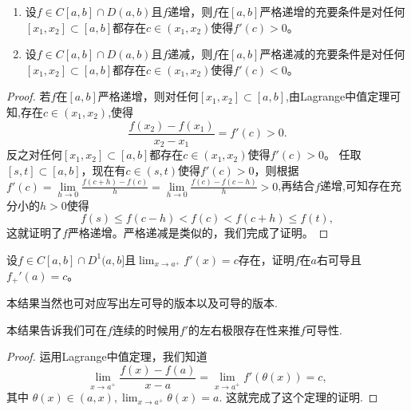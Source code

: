 \documentclass[lang=cn,newtx,10pt,scheme=chinese]{elegantbook}
\begin{document}
\begin{theorem}[严格单调和导数的关系]\label{theorem:严格单调和导数的关系}
\begin{enumerate}
\item 设\(f\in C[a,b]\cap D(a,b)\)且\(f\)递增，则\(f\)在\([a,b]\)严格递增的充要条件是对任何\([x_1,x_2]\subset [a,b]\)都存在\(c\in(x_1,x_2)\)使得\(f'(c)>0\)。

\item 设\(f\in C[a,b]\cap D(a,b)\)且\(f\)递减，则\(f\)在\([a,b]\)严格递减的充要条件是对任何\([x_1,x_2]\subset [a,b]\)都存在\(c\in(x_1,x_2)\)使得\(f'(c)<0\)。
\end{enumerate}
\end{theorem}
\begin{proof}
若\(f\)在\([a,b]\)严格递增，则对任何\([x_1,x_2]\subset [a,b]\),由Lagrange中值定理可知,存在\(c\in(x_1,x_2)\),使得
\[
\frac{f(x_2)-f(x_1)}{x_2 - x_1}=f'(c)>0.
\]
反之对任何\([x_1,x_2]\subset [a,b]\)都存在\(c\in(x_1,x_2)\)使得\(f'(c)>0\)。
任取\([s,t]\subset [a,b]\)，现在有\(c\in(s,t)\)使得\(f'(c)>0\)，则根据$f'\left( c \right) =\underset{h\rightarrow 0}{\lim}\frac{f\left( c+h \right) -f\left( c \right)}{h}=\underset{h\rightarrow 0}{\lim}\frac{f\left( c \right) -f\left( c-h \right)}{h}>0$,再结合$f$递增,可知存在充分小的\(h > 0\)使得
\[
f(s)\leqslant f(c - h)<f(c)<f(c + h)\leqslant f(t),
\]
这就证明了\(f\)严格递增。严格递减是类似的，我们完成了证明。
\end{proof}

\begin{theorem}[导数极限定理]\label{theorem:导数极限定理}
设\(f\in C[a,b]\cap D^{1}(a,b]\)且\(\lim_{x\rightarrow a^{+}}f'(x)=c\)存在，证明\(f\)在\(a\)右可导且\(f_{+}'(a)=c\)。
\end{theorem}
\begin{remark}
本结果当然也可对应写出左可导的版本以及可导的版本.
\end{remark}
\begin{note}
本结果告诉我们可在\(f\)连续的时候用\(f'\)的左右极限存在性来推\(f\)可导性.
\end{note}
\begin{proof}
运用Lagrange中值定理，我们知道
\[\lim_{x\rightarrow a^{+}}\frac{f(x)-f(a)}{x - a}=\lim_{x\rightarrow a^{+}}f'(\theta(x))=c,\]
其中
\(\theta(x)\in(a,x),\lim_{x\rightarrow a^{+}}\theta(x)=a.\)
这就完成了这个定理的证明.
\end{proof}
\end{document}
